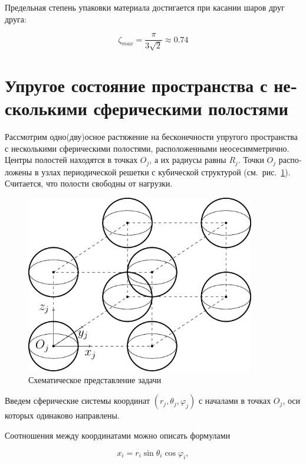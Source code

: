 \begin{russian}
Предельная степень упаковки материала достигается при касании шаров друг друга:

$$
\zeta_{max}=\frac{\pi}{3\sqrt{2}}\approx 0.74
$$

\section{Упругое состояние пространства с несколькими сферическими полостями}


Рассмотрим одно(дву)осное растяжение на бесконечности упругого пространства с несколькими сферическими полостями, расположенными неосесимметрично. Центры полостей находятся в точках $O_j$, а их радиусы равны $R_j$. Точки $O_j$ расположены в узлах периодической решетки с кубической структурой (см.~рис.~\ref{f:8:5}). Считается, что полости свободны от нагрузки.

\begin{figure}[h!]
\centering
\includegraphics[width=10cm]{cartesian-spheres.pdf}
\caption{Схематическое представление задачи}
\label{f:8:5}
\end{figure}

Введем сферические системы координат $(r_j,\theta_j,\varphi_j)$ с началами в точках $O_j$, оси которых одинаково направлены.

Соотношения между координатами можно описать формулами

\begin{equation*}
{x_i} = {r_i}\sin {\theta _i}\cos {\varphi _i},
\end{equation*}


\end{russian}
